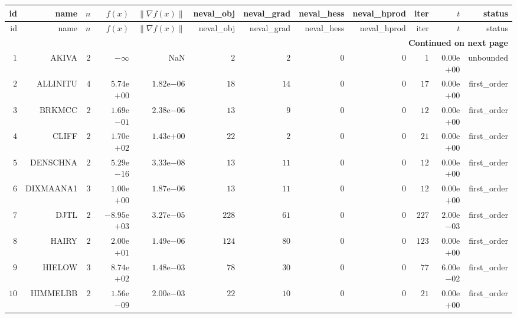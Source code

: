 \begin{longtable}{rrrrrrrrrrrr}
  \hline
  id & name & \(n\) & \(f(x)\) & \(\|\nabla f(x)\|\) & neval\_obj & neval\_grad & neval\_hess & neval\_hprod & iter & \(t\) & status \\\hline
  \endfirsthead
  \hline
  id & name & \(n\) & \(f(x)\) & \(\|\nabla f(x)\|\) & neval\_obj & neval\_grad & neval\_hess & neval\_hprod & iter & \(t\) & status \\\hline
  \endhead
  \hline
  \multicolumn{12}{r}{{\bfseries Continued on next page}}\\
  \hline
  \endfoot
  \endlastfoot
  \(     1\) & AKIVA & \(     2\) & \(-\infty\) &       NaN & \(     2\) & \(     2\) & \(     0\) & \(     0\) & \(     1\) & \( 0.00\)e\(+00\) & unbounded \\
  \(     2\) & ALLINITU & \(     4\) & \( 5.74\)e\(+00\) & \( 1.82\)e\(-06\) & \(    18\) & \(    14\) & \(     0\) & \(     0\) & \(    17\) & \( 0.00\)e\(+00\) & first\_order \\
  \(     3\) & BRKMCC & \(     2\) & \( 1.69\)e\(-01\) & \( 2.38\)e\(-06\) & \(    13\) & \(     9\) & \(     0\) & \(     0\) & \(    12\) & \( 0.00\)e\(+00\) & first\_order \\
  \(     4\) & CLIFF & \(     2\) & \( 1.70\)e\(+02\) & \( 1.43\)e\(+00\) & \(    22\) & \(     2\) & \(     0\) & \(     0\) & \(    21\) & \( 0.00\)e\(+00\) & first\_order \\
  \(     5\) & DENSCHNA & \(     2\) & \( 5.29\)e\(-16\) & \( 3.33\)e\(-08\) & \(    13\) & \(    11\) & \(     0\) & \(     0\) & \(    12\) & \( 0.00\)e\(+00\) & first\_order \\
  \(     6\) & DIXMAANA1 & \(     3\) & \( 1.00\)e\(+00\) & \( 1.87\)e\(-06\) & \(    13\) & \(    11\) & \(     0\) & \(     0\) & \(    12\) & \( 0.00\)e\(+00\) & first\_order \\
  \(     7\) & DJTL & \(     2\) & \(-8.95\)e\(+03\) & \( 3.27\)e\(-05\) & \(   228\) & \(    61\) & \(     0\) & \(     0\) & \(   227\) & \( 2.00\)e\(-03\) & first\_order \\
  \(     8\) & HAIRY & \(     2\) & \( 2.00\)e\(+01\) & \( 1.49\)e\(-06\) & \(   124\) & \(    80\) & \(     0\) & \(     0\) & \(   123\) & \( 0.00\)e\(+00\) & first\_order \\
  \(     9\) & HIELOW & \(     3\) & \( 8.74\)e\(+02\) & \( 1.48\)e\(-03\) & \(    78\) & \(    30\) & \(     0\) & \(     0\) & \(    77\) & \( 6.00\)e\(-02\) & first\_order \\
  \(    10\) & HIMMELBB & \(     2\) & \( 1.56\)e\(-09\) & \( 2.00\)e\(-03\) & \(    22\) & \(    10\) & \(     0\) & \(     0\) & \(    21\) & \( 0.00\)e\(+00\) & first\_order \\

\end{longtable}
